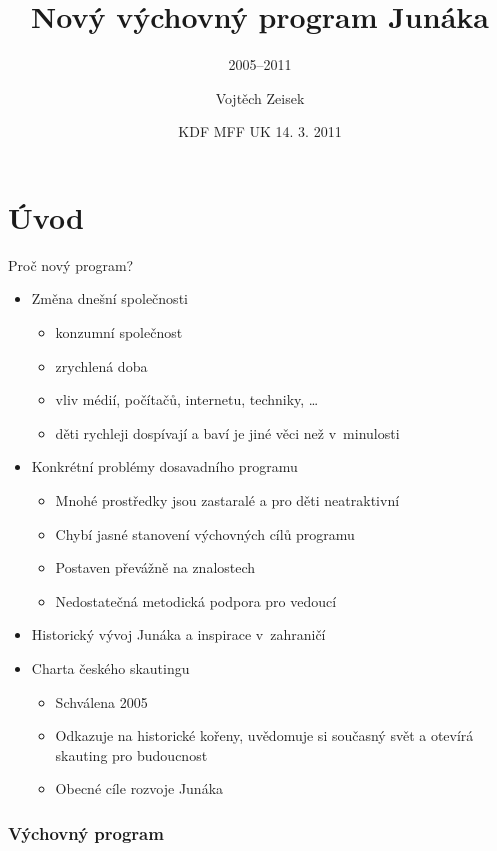 \documentclass[compress,utf8,xcolor=dvipsnames]{beamer}
\author{Vojtěch Zeisek}
\institute{Ekologický odbor Výkonné radu Junáka -- svazu skautů a skautek ČR}
\title{Nový výchovný program Junáka}
\subtitle{2005--2011}
\date{KDF MFF UK 14. 3. 2011}
\begin{document}
\begin{frame}
\titlepage
\end{frame}

\section{Úvod}

\begin{frame}{Proč nový program?}
\begin{itemize}
\item Změna dnešní společnosti
 \begin{itemize}
 \item konzumní společnost
 \item zrychlená doba
 \item vliv médií, počítačů, internetu, techniky, \ldots
 \item děti rychleji dospívají a baví je jiné věci než v~minulosti
 \end{itemize}
\item Konkrétní problémy dosavadního programu
 \begin{itemize}
 \item Mnohé prostředky jsou zastaralé a pro děti neatraktivní
 \item Chybí jasné stanovení výchovných cílů programu
 \item Postaven převážně na znalostech
 \item Nedostatečná metodická podpora pro vedoucí
 \end{itemize}
\item Historický vývoj Junáka a inspirace v zahraničí
\item Charta českého skautingu
 \begin{itemize}
 \item Schválena 2005
 \item Odkazuje na historické kořeny, uvědomuje si současný svět a otevírá skauting pro budoucnost
 \item Obecné cíle rozvoje Junáka
 \end{itemize}
\end{itemize}
\end{frame}

\subsubsection{Výchovný program}
\end{document}

